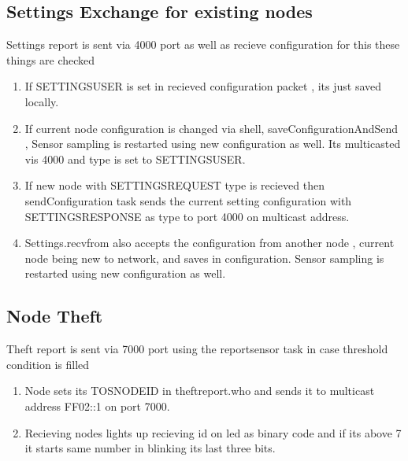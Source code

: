 \documentclass[11pt]{article} %
\begin{document}
\subsection*{Settings Exchange for existing nodes}
Settings report is sent via 4000 port as well as recieve configuration for this these things are checked
\begin{enumerate}
\item If SETTINGS\textunderscore USER is set in recieved configuration packet , its just saved locally.
\item If current node configuration is changed via shell, saveConfigurationAndSend , 
		Sensor sampling is restarted using new configuration as well.
		Its multicasted vis 4000 and type is set to SETTINGS\textunderscore USER.
\item If new node with SETTINGS\textunderscore REQUEST type is recieved then sendConfiguration task sends the current setting configuration 
		with SETTINGS\textunderscore RESPONSE as type to port 4000 on multicast address.
\item Settings.recvfrom also accepts the configuration from another node , current node being new to network, and saves in 
		configuration. Sensor sampling is restarted using new configuration as well.

\end{enumerate}

\subsection*{Node Theft}
Theft report is sent via 7000 port using the report\textunderscore sensor task in case threshold condition is filled
\begin{enumerate}
\item Node sets its TOS\textunderscore NODE\textunderscore ID in theft\textunderscore report.who and sends it to multicast address FF02::1 on port 7000.
\item Recieving nodes lights up recieving id on led as binary code and if its above 7 it starts same number in blinking its last three bits.
\end{enumerate}
\end{document}
